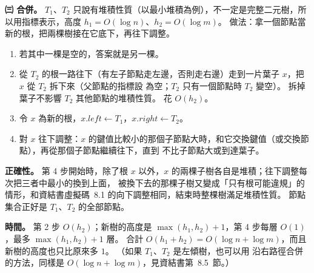 \begin{pastsoln}
\textbf{㈢ 合併。} $T_1$、$T_2$ 只說有堆積性質（以最小堆積為例），不一定是完整二元樹，所以用指標表示，高度
$h_1 = O(\log n)$、$h_2 = O(\log m)$。 做法：拿一個節點當新的根，把兩棵樹接在它底下，再往下調整。
\begin{enumerate}
\item 若其中一棵是空的，答案就是另一棵。
\item 從 $T_2$ 的根一路往下（有左子節點走左邊，否則走右邊）走到一片葉子 $x$，把 $x$ 從 $T_2$ 拆下來（父節點的指標設
為空；$T_2$ 只有一個節點時 $T_2$ 變空）。 拆掉葉子不影響 $T_2$ 其他節點的堆積性質。 花 $O(h_2)$。
\item 令 $x$ 為新的根，$x.\mathit{left} \gets T_1$，$x.\mathit{right} \gets T_2$。
\item 對 $x$ 往下調整：$x$ 的鍵值比較小的那個子節點大時，和它交換鍵值（或交換節點），再從那個子節點繼續往下，直到
不比子節點大或到達葉子。
\end{enumerate}
\textbf{正確性。} 第 4 步開始時，除了根 $x$ 以外，$x$ 的兩棵子樹各自是堆積；往下調整每次把三者中最小的換到上面，
被換下去的那棵子樹又變成「只有根可能違規」的情形，和資結書虛擬碼~8.1 的向下調整相同，結束時整棵樹滿足堆積性質。
節點集合正好是 $T_1$、$T_2$ 的全部節點。

\textbf{時間。} 第 2 步 $O(h_2)$；新樹的高度是 $\max(h_1, h_2) + 1$，第 4 步每層 $O(1)$，最多 $\max(h_1, h_2) + 1$ 層。
合計 $O(h_1 + h_2) = O(\log n + \log m)$，而且新樹的高度也只比原來多 $1$。 （如果 $T_1$、$T_2$ 是左傾樹，也可以用
沿右路徑合併的方法，同樣是 $O(\log n + \log m)$，見資結書第~8.5~節。）
\end{pastsoln}
